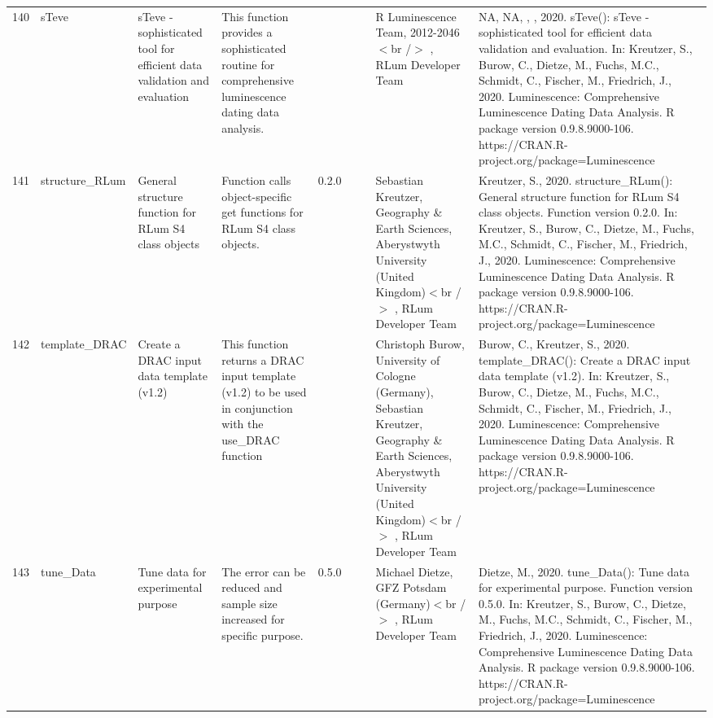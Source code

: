 \begin{table}[ht]
\begin{tabular}{rllllllll}
 \\ 
  140 & sTeve & sTeve - sophisticated tool for efficient data validation and evaluation & This function provides a sophisticated routine for comprehensive luminescence dating data analysis. &  &  &  & R Luminescence Team, 2012-2046$<$br /$>$ , RLum Developer Team & NA, NA, , , 2020. sTeve(): sTeve - sophisticated tool for efficient data validation and evaluation. In: Kreutzer, S., Burow, C., Dietze, M., Fuchs, M.C., Schmidt, C., Fischer, M., Friedrich, J., 2020. Luminescence: Comprehensive Luminescence Dating Data Analysis. R package version 0.9.8.9000-106. https://CRAN.R-project.org/package=Luminescence
 \\ 
  141 & structure\_RLum & General structure function for RLum S4 class objects & Function calls object-specific get functions for RLum S4 class objects. & 0.2.0
 &  &  & Sebastian Kreutzer, Geography \& Earth Sciences, Aberystwyth University (United Kingdom)$<$br /$>$ , RLum Developer Team & Kreutzer, S., 2020. structure\_RLum(): General structure function for RLum S4 class objects. Function version 0.2.0. In: Kreutzer, S., Burow, C., Dietze, M., Fuchs, M.C., Schmidt, C., Fischer, M., Friedrich, J., 2020. Luminescence: Comprehensive Luminescence Dating Data Analysis. R package version 0.9.8.9000-106. https://CRAN.R-project.org/package=Luminescence
 \\ 
  142 & template\_DRAC & Create a DRAC input data template (v1.2) & This function returns a DRAC input template (v1.2) to be used in conjunction with the  use\_DRAC  function &  &  &  & Christoph Burow, University of Cologne (Germany), Sebastian Kreutzer, Geography \& Earth Sciences, Aberystwyth University (United Kingdom)$<$br /$>$ , RLum Developer Team & Burow, C., Kreutzer, S., 2020. template\_DRAC(): Create a DRAC input data template (v1.2). In: Kreutzer, S., Burow, C., Dietze, M., Fuchs, M.C., Schmidt, C., Fischer, M., Friedrich, J., 2020. Luminescence: Comprehensive Luminescence Dating Data Analysis. R package version 0.9.8.9000-106. https://CRAN.R-project.org/package=Luminescence
 \\ 
  143 & tune\_Data & Tune data for experimental purpose & The error can be reduced and sample size increased for specific purpose. & 0.5.0
 &  &  & Michael Dietze, GFZ Potsdam (Germany)$<$br /$>$ , RLum Developer Team & Dietze, M., 2020. tune\_Data(): Tune data for experimental purpose. Function version 0.5.0. In: Kreutzer, S., Burow, C., Dietze, M., Fuchs, M.C., Schmidt, C., Fischer, M., Friedrich, J., 2020. Luminescence: Comprehensive Luminescence Dating Data Analysis. R package version 0.9.8.9000-106. https://CRAN.R-project.org/package=Luminescence

\end{tabular}
\end{table}
